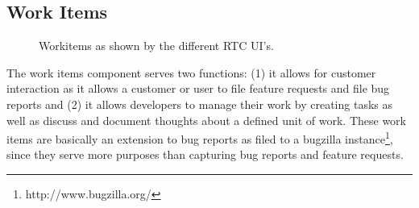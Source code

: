 \subsection{Work Items}
\begin{figure}
\centering
{}

\caption{Workitems as shown by the different RTC UI's.}
\label{fig:wi}
\end{figure}
The work items component serves two functions: (1) it allows for customer interaction as it allows a customer or user to file feature requests and file bug reports and (2) it allows developers to manage their work by creating tasks as well as discuss and document thoughts about a defined unit of work.
These work items are basically an extension to bug reports as filed to a bugzilla instance\footnote{http://www.bugzilla.org/}, since they serve more purposes than capturing bug reports and feature requests.

